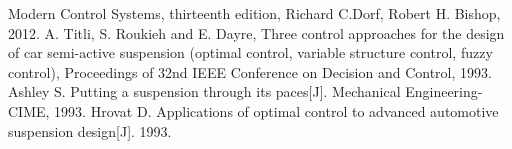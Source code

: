 \documentclass{article}
\begin{document}


\begin{thebibliography}{1}
     Modern Control Systems, thirteenth edition, Richard C.Dorf, Robert H. Bishop, 2012.
     A. Titli, S. Roukieh and E. Dayre, Three control approaches for the design of car semi-active suspension
    (optimal control, variable structure control, fuzzy control), Proceedings of 32nd IEEE Conference on
    Decision and Control, 1993.
     Ashley S. Putting a suspension through its paces[J]. Mechanical Engineering-CIME, 1993.
     Hrovat D. Applications of optimal control to advanced automotive suspension design[J]. 1993.
\end{thebibliography}
\end{document}
